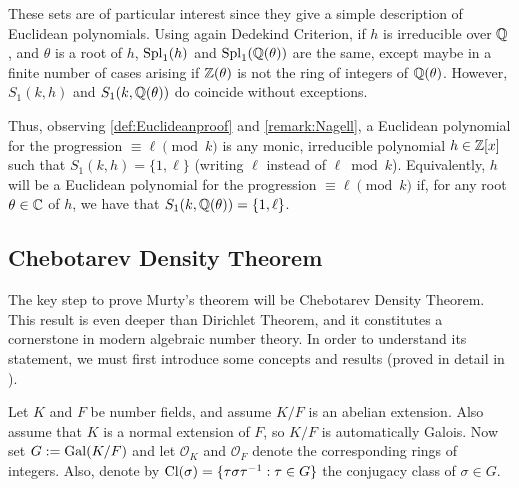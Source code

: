 \documentclass[../main.tex]{subfiles}
\begin{document}
\begin{remark}\label{rem:equalityS1}
	These sets are of particular interest since they give a simple description of Euclidean polynomials. Using again Dedekind Criterion, if $h$ is irreducible over $\mathbb{Q}$, and $\theta$ is a root of $h$, $\operatorname{Spl}_1(h)$ and $\operatorname{Spl}_1(\mathbb{Q}(\theta))$ are the same, except maybe in a finite number of cases arising if $\mathbb{Z}(\theta)$ is not the ring of integers of $\mathbb{Q}(\theta)$. However, $S_1(k,h)$ and $S_1(k, \mathbb{Q}(\theta))$ do coincide without exceptions.
	
	Thus, observing \cref{def:Euclideanproof} and \cref{remark:Nagell}, a Euclidean polynomial for the progression $\equiv\ell\pmod{k}$ is any monic, irreducible polynomial $h\in\mathbb{Z}[x]$ such that $S_1(k,h)=\{1, \ell\}$ (writing $\ell$ instead of $\ell \bmod{k}$). Equivalently, $h$ will be a Euclidean polynomial for the progression $\equiv\ell\pmod{k}$ if, for any root $\theta\in\mathbb{C}$ of $h$, we have that $S_1(k,\mathbb{Q}(\theta))=\{1, \ell\}$.
\end{remark}

\subsection{Chebotarev Density Theorem}\label{sec:Chebotarev}

The key step to prove Murty's theorem will be Chebotarev Density Theorem. This result is even deeper than Dirichlet Theorem, and it constitutes a cornerstone in modern algebraic number theory. In order to understand its statement, we must first introduce some concepts and results (proved in detail in \cite{Marcus}). 

Let $K$ and $F$ be number fields, and assume $K/F$ is an abelian extension. Also assume that $K$ is a normal extension of $F$, so $K/F$ is automatically Galois. Now set $G:=\operatorname{Gal}(K/F)$ and let $\mathcal{O}_K$ and $\mathcal{O}_F$ denote the corresponding rings of integers. Also, denote by $\operatorname{Cl}(\sigma)=\{\tau\sigma\tau^{-1}: \tau\in G\}$ the conjugacy class of $\sigma\in G$.
\end{document}
